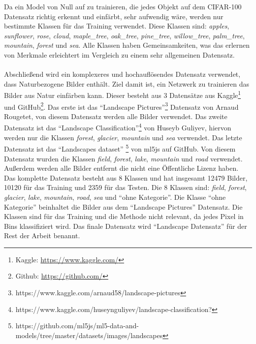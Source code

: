 Da ein Model von Null auf zu trainieren, die jedes Objekt auf dem CIFAR-100 Datensatz richtig erkennt und einfärbt, sehr aufwendig wäre, werden
nur bestimmte Klassen für das Training verwendet. Diese Klassen sind: \textit{apples}, \textit{sunflower}, \textit{rose}, \textit{cloud}, 
\textit{maple\_tree}, \textit{oak\_tree}, \textit{pine\_tree}, \textit{willow\_tree}, \textit{palm\_tree},
\textit{mountain}, \textit{forest} und \textit{sea}.
Alle Klassen haben Gemeinsamkeiten, was das erlernen von Merkmale erleichtert im Vergleich zu einem sehr allgemeinen Datensatz.
\\
\\
Abschließend wird ein komplexeres und hochauflösendes Datensatz verwendet, dass Naturbezogene Bilder enthält. Ziel damit ist, ein Netzwerk zu
trainieren das Bilder aus Natur einfärben kann. Dieser besteht aus 3 Datensätze aus 
Kaggle\footnote{Kaggle: \url{https://www.kaggle.com/}} und GitHub\footnote{Github: \url{https://github.com/}}. 
Das erste ist das ``Landscape Pictures''\footnote{https://www.kaggle.com/arnaud58/landscape-pictures} Datensatz von Arnaud Rougetet, von diesem
Datensatz werden alle Bilder verwendet. Das zweite Datensatz ist das 
``Landscape Classification''\footnote{https://www.kaggle.com/huseynguliyev/landscape-classification?} von Huseyb Guliyev, hiervon werden nur
die Klassen \textit{forest}, \textit{glacier}, \textit{mountain} und \textit{sea} verwendet. Das letzte Datensatz ist das ``Landscapes dataset''
\footnote{https://github.com/ml5js/ml5-data-and-models/tree/master/datasets/images/landscapes} von ml5js auf GitHub. Von diesem Datensatz wurden
die Klassen \textit{field}, \textit{forest}, \textit{lake}, \textit{mountain} und \textit{road} verwendet. Außerdem werden alle Bilder entfernt
die nicht eine Öffentliche Lizenz haben.
\\
Das komplette Datensatz besteht aus 8 Klassen und hat insgesamt
12479 Bilder, 10120 für das Training und 2359 für das Testen. Die 8 Klassen sind: \textit{field}, \textit{forest}, \textit{glacier}, 
\textit{lake}, \textit{mountain}, \textit{road}, \textit{sea} und ``ohne Kategorie''.
Die Klasse ``ohne Kategorie'' beinhaltet die Bilder aus dem ``Landscape Pictures'' Datensatz. Die Klassen sind für das Training und 
die Methode nicht relevant, da jedes Pixel in Bins klassifiziert wird. Das finale Datensatz wird ``Landscape Datensatz'' für der Rest der 
Arbeit benannt.


